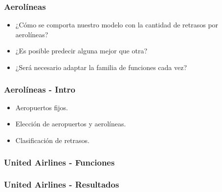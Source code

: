 \documentclass{beamer}
\begin{document}

\begin{frame}


\frametitle{Aerolíneas}

\begin{itemize}
    \item{¿Cómo se comporta nuestro modelo con la cantidad de retrasos por aerolíneas?}
    \item{¿Es posible predecir alguna mejor que otra?}
    \item{¿Será necesario adaptar la familia de funciones cada vez?}
\end{itemize}

\end{frame}


\begin{frame}


\frametitle{Aerolíneas - Intro}

\begin{itemize}
    \item{Aeropuertos fijos.}
    \item{Elección de aeropuertos y aerolíneas.}
    \item{Clasificación de retrasos.}
\end{itemize}

\end{frame}



\begin{frame}


\frametitle{United Airlines - Funciones}


\end{frame}



\begin{frame}


\frametitle{United Airlines - Resultados}


\end{frame}
\end{document}
